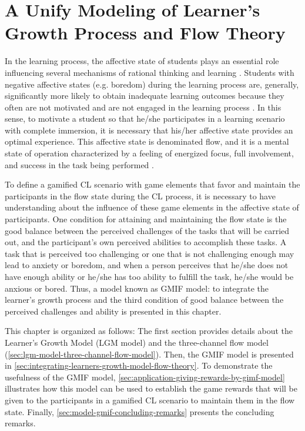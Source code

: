 \chapter[A Unify Modeling of Learner's Growth Process and Flow Theory]{A Unify Modeling of Learner's Growth Process and Flow Theory}
\label{chapter:unify-modeling-learner-growth-flow-theory}

In the learning process, the affective state of students plays an essential role influencing several mechanisms of rational thinking and learning \cite{DMello2012, Picard2000, ReisRodriguezLyraJaquesBittencourtIsotani2015}.
Students with negative affective states (e.g. boredom) during the learning process are, generally, significantly more likely to obtain inadequate learning outcomes because they often are not motivated and are not engaged in the learning process \cite{CraigGraesserSullinsGholson2004, ShernoffCsikszentmihalyiSchneiderShernoff2014}.
In this sense, to motivate a student so that he/she participates in a learning scenario with complete immersion, it is necessary that his/her affective state provides an optimal experience.
This affective state is denominated flow, and it is a mental state of operation characterized by a feeling of energized focus, full involvement, and success in the task being performed \cite{Csikszentmihalyi2008}. 

To define a gamified CL scenario with game elements that favor and maintain the participants in the flow state during the CL process, it is necessary to have understanding about the influence of these game elements in the affective state of participants.
One condition for attaining and maintaining the flow state is the good balance between the perceived challenges of the tasks that will be carried out, and the participant’s own perceived abilities to accomplish these tasks.
A task that is perceived too challenging or one that is not challenging enough may lead to anxiety or boredom, and when a person perceives that he/she does not have enough ability or he/she has too ability to fulfill the task, he/she would be anxious or bored.
Thus, a model known as GMIF model:  to integrate the learner's growth process and the third condition of good balance between the perceived challenges and ability is presented in this chapter. 

This chapter is organized as follows: The first section provides details about the Learner’s Growth Model (LGM model) and the three-channel flow model (\autoref{sec:lgm-model-three-channel-flow-model}).
Then, the GMIF model is presented in \autoref{sec:integrating-learners-growth-model-flow-theory}.
To demonstrate the usefulness of the GMIF model, \autoref{sec:application-giving-rewards-by-gimf-model} illustrates how this model can be used to establish the game rewards that will be given to the participants in a gamified CL scenario to maintain them in the flow state.
Finally, \autoref{sec:model-gmif-concluding-remarks} presents the concluding remarks.

